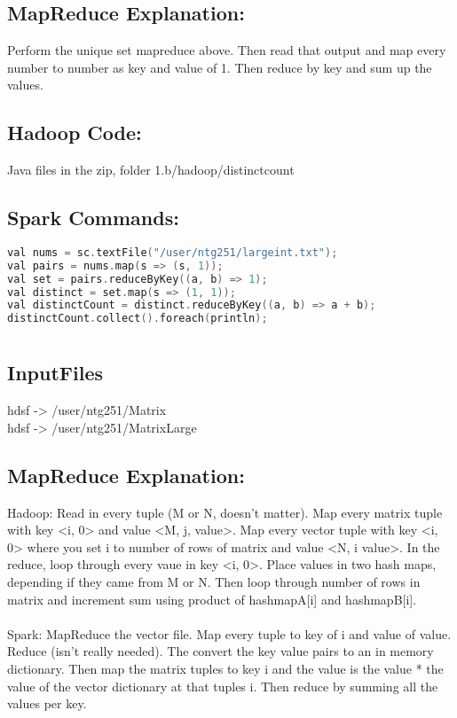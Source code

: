 \subsection*{MapReduce Explanation:}
Perform the unique set mapreduce above. Then read that output and map every number to number as key and value of 1. Then reduce by key and sum up the values. 

\subsection*{Hadoop Code:}
Java files in the zip, folder 1.b/hadoop/distinctcount

\subsection*{Spark Commands:}
\begin{lstlisting}[language=c++]
val nums = sc.textFile("/user/ntg251/largeint.txt");
val pairs = nums.map(s => (s, 1));
val set = pairs.reduceByKey((a, b) => 1);
val distinct = set.map(s => (1, 1));
val distinctCount = distinct.reduceByKey((a, b) => a + b);
distinctCount.collect().foreach(println);
\end{lstlisting}

\section*{}
\subsection*{InputFiles}
hdsf -> /user/ntg251/Matrix
\\
hdsf -> /user/ntg251/MatrixLarge

\subsection*{MapReduce Explanation:}
Hadoop: Read in every tuple (M or N, doesn't matter). Map every matrix tuple with key <i, 0> and value <M, j, value>. Map every vector tuple with key <i, 0> where you set i to number of rows of matrix and value <N, i value>. In the reduce, loop through every vaue in key <i, 0>. Place values in two hash maps, depending if they came from M or N. Then loop through number of rows in matrix and increment sum using product of hashmapA[i] and hashmapB[i].
\\
\\
Spark: MapReduce the vector file. Map every tuple to key of i and value of value. Reduce (isn't really needed). The convert the key value pairs to an in memory dictionary. Then map the matrix tuples to key i and the value is the value * the value of the vector dictionary at that tuples i. Then reduce by summing all the values per key. 

